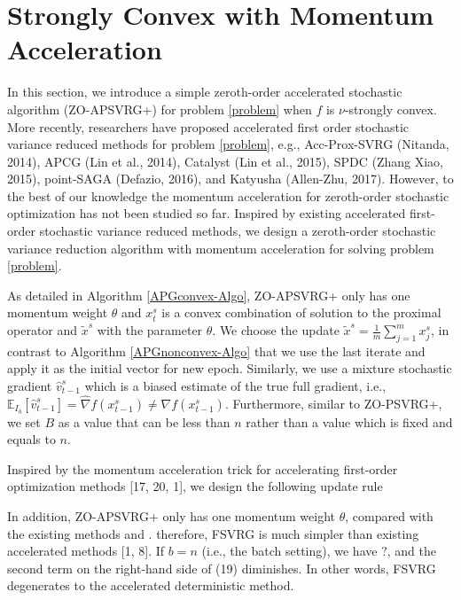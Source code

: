 \documentclass{article}
\newcommand*{\E}{\mathbb{E}}
\theoremstyle{definition}
\theoremstyle{remark}
\begin{document}
\section{Strongly Convex with Momentum Acceleration}
{\color{DarkOrchid}
In this section, we introduce a simple zeroth-order accelerated stochastic algorithm (ZO-APSVRG+) for problem \eqref{problem} when $f$ is $\nu$-strongly convex.
More recently, researchers have proposed accelerated first order stochastic variance reduced methods for problem \ref{problem}, e.g., Acc-Prox-SVRG (Nitanda, 2014), APCG (Lin et al., 2014), Catalyst (Lin et al., 2015), SPDC (Zhang  Xiao, 2015), point-SAGA (Defazio, 2016), and Katyusha (Allen-Zhu, 2017). However, to the best of our knowledge the momentum acceleration for zeroth-order stochastic optimization has not been studied so far. Inspired by existing accelerated first-order stochastic variance reduced methods, we design a zeroth-order stochastic variance reduction algorithm with momentum acceleration for solving problem \eqref{problem}.


As detailed in Algorithm \ref{APGconvex-Algo}, ZO-APSVRG+ only has one momentum weight $\theta$ and $x_t^s$ is a
convex combination of solution to the proximal operator and $\widetilde{x}^s$ with the parameter $\theta$. We choose the update $\widetilde{x}^s = \frac{1}{m}\sum_{j=1}^{m}x_j^s$, in contrast to Algorithm \ref{APGnonconvex-Algo} that we use the last iterate and apply it as the initial vector for new epoch.
Similarly, we use a mixture stochastic gradient ${\hat{v}}_{t-1}^s$  which is a biased estimate of the true full gradient, i.e., $\E_{I_b}[\hat{v}_{t-1}^s] = \hat{\nabla} f(x_{t-1}^s) \neq {\nabla} f(x_{t-1}^s)$. Furthermore, similar to ZO-PSVRG+, we set $B$ as a value that can be less than $n$ rather than a value which is fixed and equals to $n$. 





Inspired by the momentum acceleration trick for accelerating first-order optimization methods [17, 20, 1], we design the following update rule

In addition, ZO-APSVRG+ only has one momentum weight $\theta$, compared with the existing methods and . therefore, FSVRG is much simpler than existing accelerated methods [1, 8]. If $b = n$ (i.e., the
batch setting), we have $?$, and the second term on the right-hand side of (19) diminishes. In other words, FSVRG degenerates to the accelerated deterministic method.
}
\end{document}
